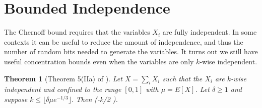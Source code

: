\documentclass[11pt,a4paper]{article}
\newtheorem{theorem}{Theorem}
\newtheorem{corollary}[theorem]{Corollary}
\newcommand*{\E}[0]{\mathbf{E}}
\def\[#1\]{\begin{align*}#1\end{align*}}
\begin{document}



\section{Bounded Independence}

The Chernoff bound requires that the variables \(X_i\) are fully independent.
In some contexts it can be useful to reduce the amount of independence, and thus the number of random bits needed to generate the variables.
It turns out we still have useful concentration bounds even when the variables are only \(k\)-wise independent.

\begin{theorem}[Theorem 5(IIa) of \cite{limited-chernoff}]
  \label{thm:limited-chernoff}
  Let \(X = \sum_i X_i\) such that the \(X_i\) are \(k\)-wise independent and confined to the range \([0, 1]\) with \(\mu = E[X]\).
  Let \(\delta \ge 1\) and suppose \(k \le \lfloor \delta \mu e^{-1/3} \rfloor.\)
  Then \[\Pr[X \ge (1 + \delta)\mu] \le \exp(-\lfloor k/2 \rfloor).\]
\end{theorem}
\end{document}
